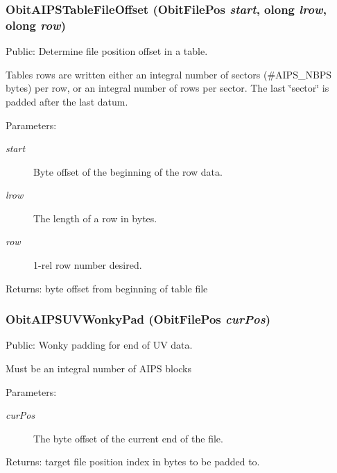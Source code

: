 \subsubsection{ Obit\-AIPSTable\-File\-Offset ({\bf Obit\-File\-Pos} {\em start}, {\bf olong} {\em lrow}, {\bf olong} {\em row})}\label{ObitAIPS_8h_a19}


Public: Determine file position offset in a table. 

Tables rows are written either an integral number of sectors (\#AIPS\_\-NBPS bytes) per row, or an integral number of rows per sector. The last \char`\"{}sector\char`\"{} is padded after the last datum. \begin{Desc}
\item[Parameters:]
\begin{description}
\item[{\em start}]Byte offset of the beginning of the row data. \item[{\em lrow}]The length of a row in bytes. \item[{\em row}]1-rel row number desired. \end{description}
\end{Desc}
\begin{Desc}
\item[Returns:]byte offset from beginning of table file \end{Desc}
\subsubsection{ Obit\-AIPSUVWonky\-Pad ({\bf Obit\-File\-Pos} {\em cur\-Pos})}\label{ObitAIPS_8h_a21}


Public: Wonky padding for end of UV data. 

Must be an integral number of AIPS blocks \begin{Desc}
\item[Parameters:]
\begin{description}
\item[{\em cur\-Pos}]The byte offset of the current end of the file. \end{description}
\end{Desc}
\begin{Desc}
\item[Returns:]target file position index in bytes to be padded to. \end{Desc}
